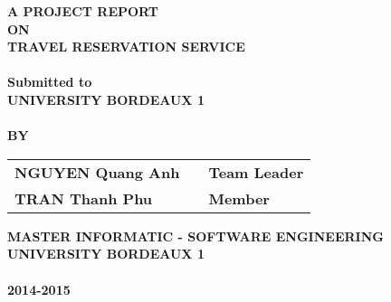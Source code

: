 \newpage
\begin{center}
\thispagestyle{empty}
\Large{\textbf{A PROJECT REPORT\\ \large{ON}}}\\[0.7cm]
\LARGE{\textsc {\textbf{TRAVEL RESERVATION SERVICE}}}\\[0.5cm]
\vspace{0.5cm}
\Large{\textbf{\\Submitted to}}
\LARGE{\textbf{\\UNIVERSITY BORDEAUX 1\\}}
\vspace{1cm}
\vspace{1cm}
\Large{\textbf{\\BY}}\\[0.5cm]
\begin{table}[h]
\centering
\Large{
\begin{tabular}{>{\bfseries}lc>{\bfseries}l}
NGUYEN Quang Anh & & Team Leader\\
TRAN Thanh Phu & & Member\\
\end{tabular}}
\end{table}
\vspace{1.5cm}
\large{\textbf{MASTER INFORMATIC - SOFTWARE ENGINEERING}}\\
\Large{\textbf{UNIVERSITY BORDEAUX 1}}\\
\large{\textbf{\\2014-2015}}\\
\vspace{1cm}
\newpage
\end{center}
